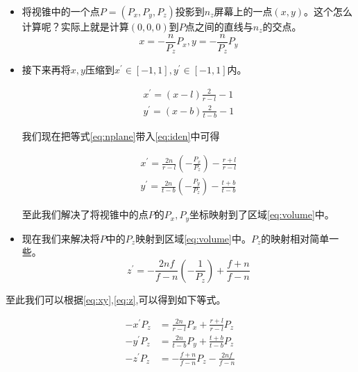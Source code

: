 \documentclass{article} \usepackage{braket} \usepackage{amsmath,amssymb} \usepackage{geometry} \usepackage{graphicx} \usepackage{braket} \usepackage{bm}\usepackage{hyperref} \usepackage{CJKutf8}
\begin{document}
\begin{CJK}{UTF8}{gbsn}
  \begin{itemize}
  \item 将视锥中的一个点$P=(P_x,P_y,P_z)$投影到$n_z$屏幕上的一点$(x,y)$。这个怎么计算呢？实际上就是计算$(0,0,0)$到$P$点之间的直线与$n_z$的交点。
    \begin{equation}
      \label{eq:nplane}
      x=-\frac{n}{P_z}P_x,y=-\frac{n}{P_z}P_y
    \end{equation}
  \item 接下来再将$x,y$压缩到$x^{'}\in [-1,1],y^{'}\in [-1,1]$内。

    \begin{equation}
      \label{eq:iden}
      \left.
        \begin{aligned}
          x^{'}=(x-l)\frac{2}{r-l}-1\\
          y^{'}=(x-b)\frac{2}{t-b}-1
        \end{aligned}
      \right.
    \end{equation}

    我们现在把等式\eqref{eq:nplane}带入\eqref{eq:iden}中可得

    \begin{equation}
      \label{eq:xy}
      \left.
        \begin{aligned}
          x^{\prime}=\frac{2 n}{r-l}\left(-\frac{P_{x}}{P_{z}}\right)-\frac{r+l}{r-l}\\
          y^{\prime}=\frac{2 n}{t-b}\left(-\frac{P_{y}}{P_{z}}\right)-\frac{t+b}{t-b}
        \end{aligned}
      \right.
    \end{equation}

    至此我们解决了将视锥中的点$P$的$P_x,P_y$坐标映射到了区域\eqref{eq:volume}中。
  \item 现在我们来解决将$P$中的$P_z$映射到区域\eqref{eq:volume}中。$P_z$的映射相对简单一些。
    \begin{equation}
      \label{eq:z}
      z^{\prime}=-\frac{2 n f}{f-n}\left(-\frac{1}{P_{z}}\right)+\frac{f+n}{f-n}
    \end{equation}
  \end{itemize}

  至此我们可以根据\eqref{eq:xy},\eqref{eq:z},可以得到如下等式。

  \begin{equation}
    \label{eq:xyz}
    \left.
      \begin{aligned}
        -x^{\prime} P_{z}&=\frac{2 n}{r-l} P_{x}+\frac{r+l}{r-l} P_{z}\\
        -y^{\prime} P_{z}&=\frac{2 n}{t-b} P_{y}+\frac{t+b}{t-b} P_{z}\\
        -z^{\prime} P_{z}&=-\frac{f+n}{f-n} P_{z}-\frac{2 n f}{f-n}
      \end{aligned}
    \right.
  \end{equation}


\end{CJK}
\end{document}

